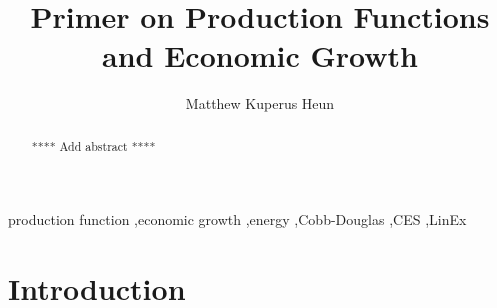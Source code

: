 \documentclass[preprint,authoryear,12pt]{elsarticle}
\begin{document}
\begin{frontmatter}



\title{Primer on Production Functions and Economic Growth}


\author[CalvinEngr]{Matthew Kuperus Heun}

\address[CalvinEngr]{Engineering Department, Calvin College, Grand Rapids, MI 49546, USA}

\begin{abstract}
**** Add abstract ****
\end{abstract}

\begin{keyword}
production function \sep economic growth \sep energy \sep Cobb-Douglas \sep CES \sep LinEx
\end{keyword}

\end{frontmatter}



\section{Introduction} 
\label{sec:Introduction}
\end{document}
